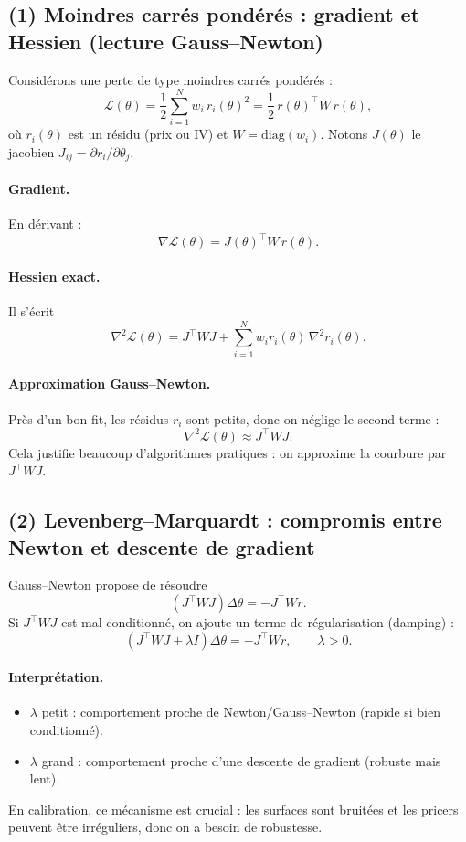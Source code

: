 
\subsection*{(1) Moindres carrés pondérés : gradient et Hessien (lecture Gauss--Newton)}
Considérons une perte de type moindres carrés pondérés :
\[
\mathcal{L}(\theta)=\frac12\sum_{i=1}^N w_i\,r_i(\theta)^2
=\frac12\,r(\theta)^\top W\,r(\theta),
\]
où $r_i(\theta)$ est un résidu (prix ou IV) et $W=\mathrm{diag}(w_i)$.
Notons $J(\theta)$ le jacobien $J_{ij}=\partial r_i/\partial \theta_j$.

\paragraph{Gradient.}
En dérivant :
\[
\nabla \mathcal{L}(\theta)=J(\theta)^\top W\,r(\theta).
\]
\paragraph{Hessien exact.}
Il s'écrit
\[
\nabla^2\mathcal{L}(\theta)=J^\top WJ + \sum_{i=1}^N w_i r_i(\theta)\,\nabla^2 r_i(\theta).
\]
\paragraph{Approximation Gauss--Newton.}
Près d'un bon fit, les résidus $r_i$ sont petits, donc on néglige le second terme :
\[
\nabla^2\mathcal{L}(\theta)\approx J^\top WJ.
\]
Cela justifie beaucoup d'algorithmes pratiques : on approxime la courbure par $J^\top WJ$.

\subsection*{(2) Levenberg--Marquardt : compromis entre Newton et descente de gradient}
Gauss--Newton propose de résoudre
\[
(J^\top WJ)\Delta\theta = -J^\top Wr.
\]
Si $J^\top WJ$ est mal conditionné, on ajoute un terme de régularisation (damping) :
\[
(J^\top WJ+\lambda I)\Delta\theta = -J^\top Wr,\qquad \lambda>0.
\]
\paragraph{Interprétation.}
\begin{itemize}[leftmargin=*]
\item $\lambda$ petit : comportement proche de Newton/Gauss--Newton (rapide si bien conditionné).
\item $\lambda$ grand : comportement proche d'une descente de gradient (robuste mais lent).
\end{itemize}
En calibration, ce mécanisme est crucial : les surfaces sont bruitées et les pricers peuvent être irréguliers, donc on a besoin de robustesse.

